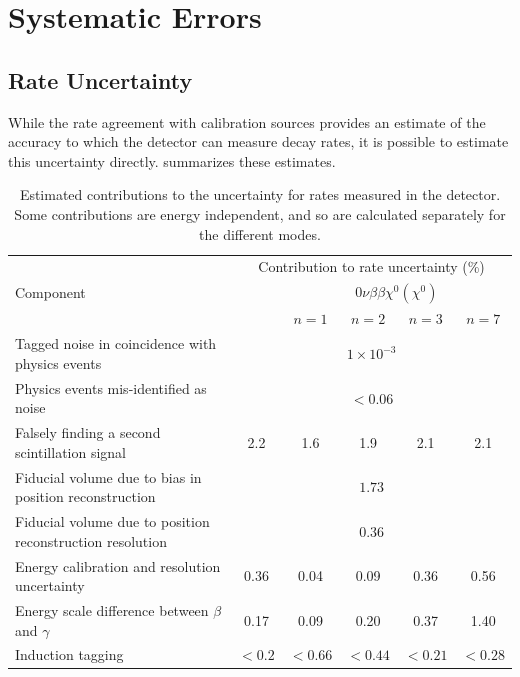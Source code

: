 \documentclass[herrin-thesis.tex]{subfiles}
\begin{document}
\section{Systematic Errors}
\subsection{Rate Uncertainty}
\label{sec:analysis_rate_uncertainty}
While the rate agreement with calibration sources provides an estimate of the accuracy to which the detector can measure decay rates, it is possible to estimate this uncertainty directly.  summarizes these estimates.

\begin{table}[tbp]
\centering
\caption[Contributions to systematic uncertainty on rate]{Estimated contributions to the uncertainty for rates measured in the detector. Some contributions are energy independent, and so are calculated separately for the different modes.}
\label{tab:analysis_normalization_uncertainty}
\begin{tabular}{p{} c c c c c}\toprule
			&	\multicolumn{5}{c}{Contribution to rate uncertainty (\%)}				\\
Component	&	\twonu{}	&	\multicolumn{4}{c}{\(0\nu\beta\beta\chi^0(\chi^0)\)}		\\
			&			&	\(n = 1\)	&	\(n = 2\)	&	\(n = 3\)	&	\(n = 7\)	\\
Tagged noise in coincidence with physics events		&	\multicolumn{5}{c}{\(1\times10^{-3}\)}		\\
Physics events mis-identified as noise				&	\multicolumn{5}{c}{\(<0.06\)}				\\
Falsely finding a second scintillation signal			&	2.2	&	1.6	&	1.9	&	2.1	&	2.1	\\
Fiducial volume due to bias in position reconstruction	&	\multicolumn{5}{c}{\(1.73\)}				\\
Fiducial volume due to position reconstruction resolution	&	\multicolumn{5}{c}{\(0.36\)}				\\
Energy calibration and resolution uncertainty			&	0.36	&	0.04	&	0.09	&	0.36	&	0.56	\\
Energy scale difference between \(\beta\) and \(\gamma\)	&	0.17	&	0.09	&	0.20	&	0.37	&	1.40	\\
Induction tagging								&	\(<0.2\)&	\(<0.66\)	&	\(<0.44\)	&	\(<0.21\)	&	\(<0.28\)	\\

\end{tabular}
\end{table}
\end{document}
